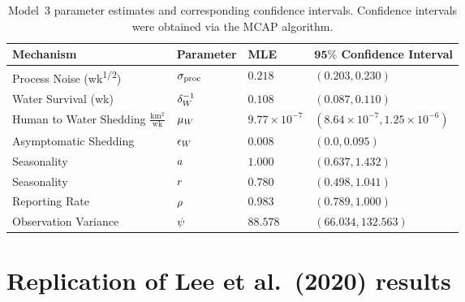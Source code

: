 \begin{table}[!h]
\centering
\caption[Model~3 parameter estimates and corresponding confidence intervals.]{\label{tab:mod3CI}Model~3 parameter estimates and corresponding confidence intervals. Confidence intervals were obtained via the MCAP algorithm.}
\vspace{2mm}
\begin{tabular}{|L{3.60cm}|C{2.1cm}|C{1.9cm}|C{4.3cm}|}
\hline
\centering \textbf{Mechanism} & \textbf{Parameter} & \textbf{MLE} & $\bm{95\%}$ \textbf{Confidence Interval} \\
\hline
\hline

 Process Noise {\footnotesize (wk\textsuperscript{1/2})} & $\sigma_{\mathrm{proc}}$ & $0.218$
   &
  $(0.203, 0.230)$
\\
\hline

 Water Survival {\footnotesize (wk)} & $\delta_W^{-1}$ & $0.108$
   &
  $(0.087, 0.110)$
\\
\hline

 Human to Water Shedding {\footnotesize $\frac{\mathrm{km^2}}{\mathrm{wk}}$} & $\mu_W$ & $\ensuremath{9.77\times 10^{-7}}$
   &
  $(\ensuremath{8.64\times 10^{-7}}, \ensuremath{1.25\times 10^{-6}})$
\\
\hline

 Asymptomatic Shedding & $\epsilon_{W}$ & $0.008$
   &
  $(0.0, 0.095)$
\\
\hline

 Seasonality & $a$ & $1.000$
   &
  $(0.637, 1.432)$
\\
\hline

 Seasonality & $r$ & $0.780$
   &
  $(0.498, 1.041)$
\\
\hline

 Reporting Rate & $\rho$ & $0.983$
   &
  $(0.789, 1.000)$
\\
\hline

 Observation Variance & $\psi$ & $88.578$
   &
  $(66.034, 132.563)$
\\
\hline

\end{tabular}
\end{table}

\section{Replication of Lee et al.~(2020) results}\label{sec:appendix_haiti_lee20}

